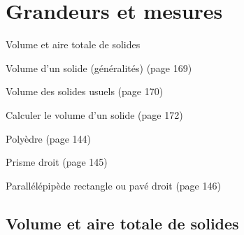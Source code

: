\documentclass[a4paper,11pt]{report}
\begin{document}
\newcommand{\chapterName}{Grandeurs et mesures}
\newcommand{\serieName}{Volume et aire totale de solides}


\chapter*{\chapterName}
\thispagestyle{empty}

\begin{amL}{\serieName}{
\item Volume d'un solide (généralités) (page 169)
\item Volume des solides usuels (page 170)
\item Calculer le volume d'un solide (page 172)
\item Polyèdre (page 144)
\item Prisme droit (page 145)
\item Parallélépipède rectangle ou pavé droit (page 146)
}\end{amL}

\section*{\serieName}
\setcounter{page}{1}
\thispagestyle{firstPage}



\end{document}
